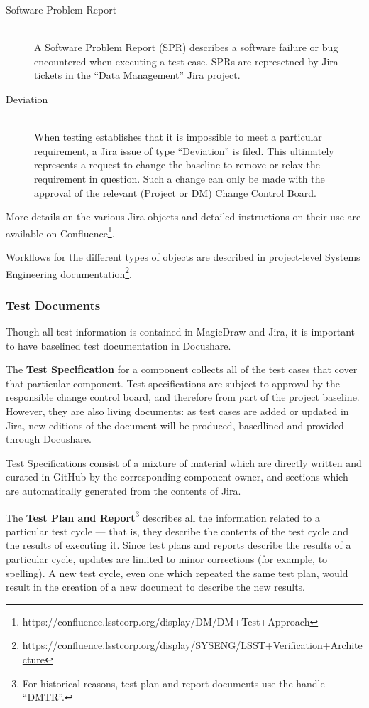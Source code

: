 \begin{description}
\item[Software Problem Report] \hfill \\
A Software Problem Report (SPR) describes a software failure or bug encountered when executing a test case.
SPRs are represetned by Jira tickets in the ``Data Management'' Jira project.

\item[Deviation] \hfill \\
When testing establishes that it is impossible to meet a particular requirement, a Jira issue of type ``Deviation'' is filed.
This ultimately represents a request to change the baseline to remove or relax the requirement in question.
Such a change can only be made with the approval of the relevant (Project or DM) Change Control Board.

\end{description}

More details on the various Jira objects and detailed instructions on their use are available on Confluence\footnote{https://confluence.lsstcorp.org/display/DM/DM+Test+Approach}.

Workflows for the different types of objects are described in project-level Systems Engineering documentation\footnote{\url{https://confluence.lsstcorp.org/display/SYSENG/LSST+Verification+Architecture}}.

\subsubsection{Test Documents}
\label{sect:testdocs}

Though all test information is contained in MagicDraw and Jira, it is important to have baselined test documentation in Docushare.

The \textbf{Test Specification} for a component collects all of the test cases that cover that particular component.
Test specifications are subject to approval by the responsible change control board, and therefore from part of the project baseline.
However, they are also living documents: as test cases are added or updated in Jira, new editions of the document will be produced, basedlined and provided through Docushare.

Test Specifications consist of a mixture of material which are directly written and curated in GitHub by the corresponding component owner, and sections which are automatically generated from the contents of Jira.

The \textbf{Test Plan and Report}\footnote{For historical reasons, test plan and report documents use the handle ``DMTR''.}  describes all the information related to a particular test cycle --- that is, they describe the contents of the test cycle and the results of executing it.
Since test plans and reports describe the results of a particular cycle, updates are limited to minor corrections (for example, to spelling).
A new test cycle, even one which repeated the same test plan, would result in the creation of a new document to describe the new results.

